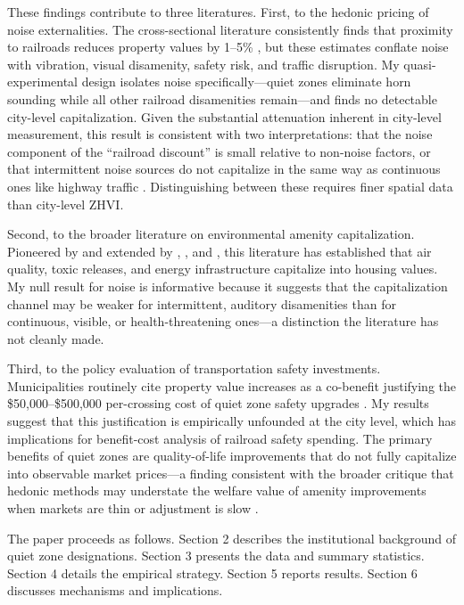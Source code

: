 \documentclass[12pt]{article}
\begin{document}
These findings contribute to three literatures. First, to the hedonic pricing of noise externalities. The cross-sectional literature consistently finds that proximity to railroads reduces property values by 1--5\% \citep{theebe2004planes, espey2004valuing, clark2023rail}, but these estimates conflate noise with vibration, visual disamenity, safety risk, and traffic disruption. My quasi-experimental design isolates noise specifically---quiet zones eliminate horn sounding while all other railroad disamenities remain---and finds no detectable city-level capitalization. Given the substantial attenuation inherent in city-level measurement, this result is consistent with two interpretations: that the noise component of the ``railroad discount'' is small relative to non-noise factors, or that intermittent noise sources do not capitalize in the same way as continuous ones like highway traffic \citep{nelson1982airports}. Distinguishing between these requires finer spatial data than city-level ZHVI.

Second, to the broader literature on environmental amenity capitalization. Pioneered by \citet{chay2005does} and extended by \citet{currie2015environmental}, \citet{davis2011effect}, and \citet{muehlenbachs2015shale}, this literature has established that air quality, toxic releases, and energy infrastructure capitalize into housing values. My null result for noise is informative because it suggests that the capitalization channel may be weaker for intermittent, auditory disamenities than for continuous, visible, or health-threatening ones---a distinction the literature has not cleanly made.

Third, to the policy evaluation of transportation safety investments. Municipalities routinely cite property value increases as a co-benefit justifying the \$50,000--\$500,000 per-crossing cost of quiet zone safety upgrades \citep{aaa2023grade}. My results suggest that this justification is empirically unfounded at the city level, which has implications for benefit-cost analysis of railroad safety spending. The primary benefits of quiet zones are quality-of-life improvements that do not fully capitalize into observable market prices---a finding consistent with the broader critique that hedonic methods may understate the welfare value of amenity improvements when markets are thin or adjustment is slow \citep{greenstone2009quasi}.

The paper proceeds as follows. Section 2 describes the institutional background of quiet zone designations. Section 3 presents the data and summary statistics. Section 4 details the empirical strategy. Section 5 reports results. Section 6 discusses mechanisms and implications.
\end{document}
